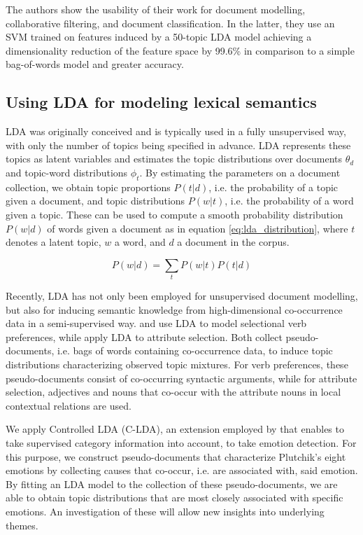The authors show the usability of their work for document modelling, collaborative filtering, and document classification. In the latter, they use an SVM trained on features induced by a 50-topic LDA model achieving a dimensionality reduction of the feature space 
by 99.6\% in comparison to a simple bag-of-words model and greater accuracy.

\subsection{Using LDA for modeling lexical semantics}

LDA was originally conceived and is typically used in a fully unsupervised way, with only the number of topics being specified in advance. LDA represents these topics as latent variables and estimates the topic distributions over documents $\theta_d$ and topic-word distributions $\phi_t$. By estimating the parameters on a document collection, we obtain topic proportions $P(t|d)$, i.e. the probability of a topic given a document, and topic distributions $P(w|t)$, i.e. the probability of a word given a topic. These can be used to compute a smooth probability distribution $P(w|d)$ of words given a document as in equation \ref{eq:lda_distribution}, where $t$ denotes a latent topic, $w$ a word, and $d$ a document in the corpus.

\begin{equation} \label{eq:lda_distribution}
P(w|d) = \sum_t P(w|t) P(t|d)
\end{equation}

Recently, LDA has not only been employed for unsupervised document modelling, but also for inducing semantic knowledge from high-dimensional co-occurrence data in a semi-supervised way. \citeauthor{lda_cite1} and \citeauthor{lda_cite2} use LDA to model selectional verb preferences, while \citeauthor{supervised_lda} apply LDA to attribute selection. Both collect pseudo-documents, i.e. bags of words containing co-occurrence data, to induce topic distributions characterizing observed topic mixtures. For verb preferences, these pseudo-documents consist of co-occurring syntactic arguments, while for attribute selection, adjectives and nouns that co-occur with the attribute nouns in local contextual relations are used.

We apply Controlled LDA (C-LDA), an extension employed by \citeauthor{supervised_lda} that enables to take supervised category information into account, to take emotion detection. For this purpose, we construct pseudo-documents that characterize Plutchik's eight emotions by collecting causes that co-occur, i.e. are associated with, said emotion. By fitting an LDA model to the collection of these pseudo-documents, we are able to obtain topic distributions that are most closely associated with specific emotions. An investigation of these will allow new insights into underlying themes.

